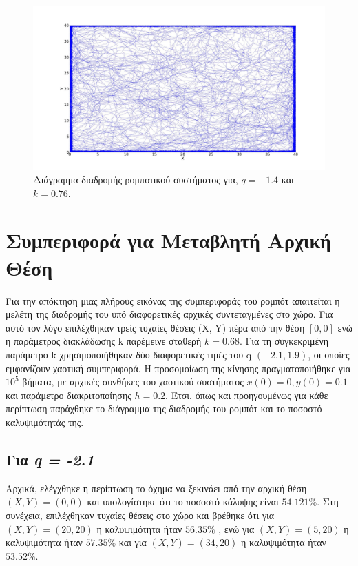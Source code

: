 \begin{figure}[ht]
	\centering
	\includegraphics[width=1\linewidth]{LateX images/log/k/g3-1.4}
	\caption{Διάγραμμα διαδρομής ρομποτικού συστήματος για, $q = -1.4$ και $k = 0.76$.}
	\label{f:g83}	
\end{figure}

\clearpage

\section{Συμπεριφορά για Μεταβλητή Αρχική Θέση}
\label{sec:g2}
Για την απόκτηση μιας πλήρους εικόνας της συμπεριφοράς του ρομπότ απαιτείται η μελέτη της διαδρομής του υπό διαφορετικές αρχικές συντεταγμένες στο χώρο. Για αυτό τον λόγο επιλέχθηκαν  τρείς τυχαίες θέσεις (X, Y) πέρα από την θέση $[0,0]$ ενώ η παράμετρος διακλάδωσης k παρέμεινε σταθερή $k = 0.68$. Για τη συγκεκριμένη παράμετρο k χρησιμοποιήθηκαν δύο διαφορετικές τιμές του q $(-2.1 , 1.9)$, οι οποίες εμφανίζουν χαοτική συμπεριφορά.
Η προσομοίωση της κίνησης πραγματοποιήθηκε για $10^5$ βήματα, με αρχικές συνθήκες του χαοτικού συστήματος $x(0) = 0,  y(0) = 0.1$ και παράμετρο διακριτοποίησης $h = 0.2$. Έτσι, όπως και προηγουμένως για κάθε περίπτωση παράχθηκε το διάγραμμα της διαδρομής του ρομπότ και το ποσοστό καλυψιμότητάς της.

\subsection{Για \emph{q = -2.1}}

Αρχικά, ελέγχθηκε η περίπτωση το όχημα να ξεκινάει από την αρχική θέση $(X,Y) = (0,0)$ και υπολογίστηκε ότι το ποσοστό κάλυψης είναι $54.121\%$. Στη συνέχεια, επιλέχθηκαν τυχαίες θέσεις στο χώρο και βρέθηκε ότι για $(X,Y) = (20,20)$ η καλυψιμότητα ήταν $56.35\%$ , ενώ για $(X,Y) = (5,20)$ η καλυψιμότητα ήταν $57.35\%$ και για $(X,Y) = (34,20)$ η καλυψιμότητα ήταν $53.52\%$. 

